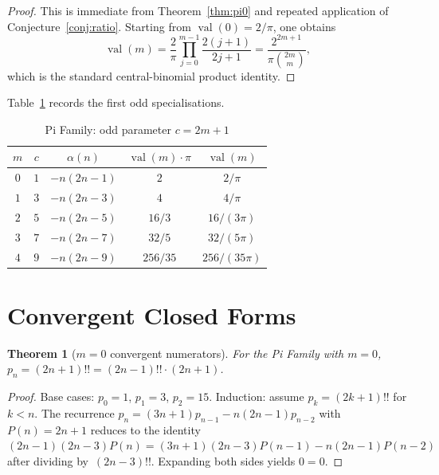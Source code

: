 \documentclass[11pt,a4paper]{article}
\theoremstyle{plain}
\newtheorem{theorem}{Theorem}[section]
\theoremstyle{definition}
\theoremstyle{remark}
\newcommand{\dff}[1]{(#1)!!}
\begin{document}
\begin{proof}
This is immediate from Theorem~\ref{thm:pi0} and repeated application of
Conjecture~\ref{conj:ratio}. Starting from $\operatorname{val}(0)=2/\pi$,
one obtains
\[
  \operatorname{val}(m)=\frac{2}{\pi}\prod_{j=0}^{m-1}\frac{2(j+1)}{2j+1}
  = \frac{2^{2m+1}}{\pi\binom{2m}{m}},
\]
which is the standard central-binomial product identity.
\end{proof}

Table~\ref{tab:pi} records the first odd specialisations.

\begin{table}[ht]
\centering
\caption{Pi Family: odd parameter $c = 2m{+}1$}\label{tab:pi}
\begin{tabular}{@{}ccccc@{}}
\toprule
$m$ & $c$ & $\alpha(n)$ & $\operatorname{val}(m)\cdot\pi$ &
$\operatorname{val}(m)$ \\
\midrule
$0$ & $1$ & $-n(2n{-}1)$ & $2$ & $2/\pi$ \\
$1$ & $3$ & $-n(2n{-}3)$ & $4$ & $4/\pi$ \\
$2$ & $5$ & $-n(2n{-}5)$ & $16/3$ & $16/(3\pi)$ \\
$3$ & $7$ & $-n(2n{-}7)$ & $32/5$ & $32/(5\pi)$ \\
$4$ & $9$ & $-n(2n{-}9)$ & $256/35$ & $256/(35\pi)$ \\
\bottomrule
\end{tabular}
\end{table}

\section{Convergent Closed Forms}\label{sec:closed}

\begin{theorem}[$m=0$ convergent numerators]\label{thm:conv0}
For the Pi Family with $m=0$,
$p_n = (2n{+}1)!! = \dff{2n{-}1}\cdot(2n{+}1)$.
\end{theorem}

\begin{proof}
Base cases: $p_0{=}1$, $p_1{=}3$, $p_2{=}15$.
Induction: assume $p_k = (2k{+}1)!!$ for $k < n$.
The recurrence $p_n = (3n{+}1)p_{n-1} - n(2n{-}1)p_{n-2}$
with $P(n) = 2n{+}1$ reduces to the identity
$(2n{-}1)(2n{-}3)P(n) = (3n{+}1)(2n{-}3)P(n{-}1) - n(2n{-}1)P(n{-}2)$
after dividing by~$\dff{2n{-}3}$.
Expanding both sides yields $0 = 0$.
\end{proof}
\end{document}

